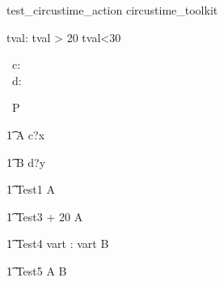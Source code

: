 \begin{zsection}
   \SECTION test\_circustime\_action \parents circustime\_toolkit
\end{zsection}

\begin{axdef}
   tval: \nat
\where
   tval > 20 \land tval<30
\end{axdef}


\begin{circus}
    \circchannel\ c: \nat \\
    \circchannel\ d: \nat \\
\end{circus}

\begin{circus}
    \circprocess\ P \circdef \circbegin \\
\end{circus}


\begin{circusaction}
    	\t1 A \circdef c?x \then \Skip \\
\end{circusaction}

\begin{circusaction}
        \t1 B \circdef d?y \then \Skip \\
\end{circusaction}

\begin{circusaction}
   \t1 Test1 \circdef  {} \rcirctime \circstartby A  \\
\end{circusaction}


\begin{circusaction}
   \t1 Test3 \circdef  {} + 20 \rcirctime \circstartby A  \\
\end{circusaction}

\begin{circusaction}
   \t1 Test4 \circdef \circvres vart : \nat  \circspot  \lcirctime vart \rcirctime \circstartby B \\
\end{circusaction}


\begin{circusaction}
   \t1 Test5 \circdef  {} \rcirctime \circstartby A  \circseq B\\
\end{circusaction}

